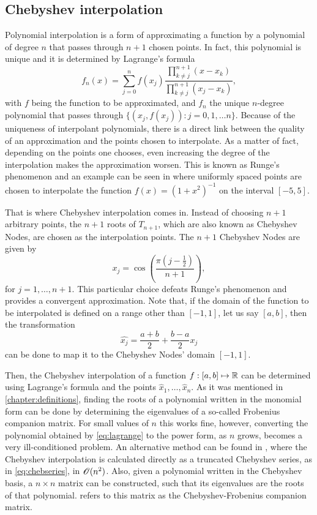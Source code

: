 \subsection{Chebyshev interpolation}
Polynomial interpolation is a form of approximating a function by a polynomial of degree $n$ that passes through $n+1$ chosen points. In fact, this polynomial is unique and it is determined by Lagrange's formula
\begin{equation}\label{eq:lagrange}
f_n(x) = \sum_{j=0}^{n} f(x_j)\dfrac{\prod_{k \neq j}^{n+1} (x-x_k)}{\prod_{k \neq j}^{n+1} (x_j-x_k)},
\end{equation}
with $f$ being the function to be approximated, and $f_n$ the unique $n$-degree polynomial that passes through $\{(x_j, f(x_j)): j=0, 1, \dots n\}$. Because of the uniqueness of interpolant polynomials, there is a direct link between the quality of an approximation and the points chosen to interpolate. As a matter of fact, depending on the points one chooses, even increasing the degree of the interpolation makes the approximation worsen. This is known as Runge's phenomenon and an example can be seen in  where uniformly spaced points are chosen to interpolate the function $f(x) = (1+x^2)^{-1}$ on the interval $[-5, 5]$. 

That is where Chebyshev interpolation comes in. Instead of choosing $n+1$ arbitrary points, the $n+1$ roots of $T_{n+1}$, which are also known as Chebyshev Nodes, are chosen as the interpolation points. The $n+1$ Chebyshev Nodes are given by
\begin{equation}
x_j = \cos{\left(\dfrac{\pi(j-\frac{1}{2})}{n+1}\right)},
\end{equation}
for $j=1, \dots, n+1$. This particular choice defeats Runge's phenomenon and provides a convergent approximation. 
Note that, if the domain of the function to be interpolated is defined on a range other than $[-1, 1]$, let us say $[a, b]$, then the transformation
\begin{equation}
\hat{x_j} = \frac{a+b}{2} + \frac{b-a}{2}x_j
\end{equation}
can be done to map it to the Chebyshev Nodes' domain $[-1, 1]$.

Then, the Chebyshev interpolation of a function $f: [a, b] \mapsto \mathbb{R}$ can be determined using Lagrange's formula and the points $\hat{x}_1, \dots, \hat{x}_n$. 
As it was mentioned in \autoref{chapter:definitions}, finding the roots of a polynomial written in the monomial form can be done by determining the eigenvalues of a so-called Frobenius companion matrix. For small values of $n$ this works fine, however, converting the polynomial obtained by \autoref{eq:lagrange} to the power form, as $n$ grows, becomes a very ill-conditioned problem. 
An alternative method can be found in , where the Chebyshev interpolation is calculated directly as a truncated Chebyshev series, as in \autoref{eq:chebseries}, in $\mathscr{O}(n^2)$. Also, given a polynomial written in the Chebyshev basis, a $n\times n$ matrix can be constructed, such that its eigenvalues are the roots of that polynomial.  refers to this matrix as the Chebyshev-Frobenius companion matrix.

